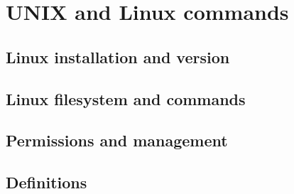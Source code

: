 \documentclass[../main.tex]{subfiles}
\begin{document}
\clearpage
\thispagestyle{empty}
\vspace*{7cm}
\section{UNIX and Linux commands}
\vspace*{1.5cm}



\subsection{Linux installation and version}

\subsection{Linux filesystem and commands}

\subsection{Permissions and management}









\subsection{Definitions}
\end{document}
